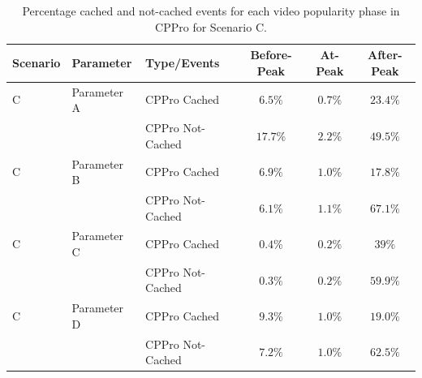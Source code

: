 \documentclass[10pt,final,journal,a4paper]{IEEEtran}
\begin{document}
\begin{table}[!t]
\caption{Percentage cached and not-cached events for each video popularity phase in CPPro for Scenario C.}
\label{tab:stacked2c}
\centering
\begin{tabular}{|l|l|l|c|c|c|}
\hline
Scenario & Parameter & Type/Events & Before-Peak & At-Peak  & After-Peak \\
\hline
C & Parameter A & CPPro Cached & $6.5\%$ & $0.7\%$ & $23.4\%$  \\
\hline
 & & CPPro Not-Cached & $17.7\%$ & $2.2\%$ & $49.5\%$ \\
 \hline

C & Parameter B & CPPro Cached & $6.9\%$ & $1.0\%$ & $17.8\%$ \\
\hline
 & & CPPro Not-Cached & $6.1\%$ & $1.1\%$ & $67.1$\% \\
\hline

C & Parameter C & CPPro Cached & $0.4\%$ & $0.2\%$ & $39\%$ \\
\hline
 & & CPPro Not-Cached & $0.3\%$ & $0.2\%$ & $59.9\%$ \\
\hline

C & Parameter D & CPPro Cached & $9.3\%$ & $1.0\%$ & $19.0\%$ \\
\hline
 & & CPPro Not-Cached & $7.2\%$ & $1.0\%$ & $62.5\%$ \\
\hline

\end{tabular}
\end{table}






\end{document}

